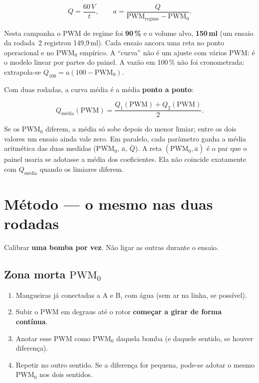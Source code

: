 \documentclass[11pt,a4paper]{article}
\newcommand{\pwmz}{\mathrm{PWM}_0}
\begin{document}
\begin{equation}
Q = \frac{60\,V}{t},
\qquad
a = \frac{Q}{\mathrm{PWM}_{\mathrm{regime}} - \pwmz}.
\end{equation}

Nesta campanha o PWM de regime foi \textbf{90\,\%} e o volume alvo,
\textbf{150\,ml} (um ensaio da rodada~2 registrou 149,9\,ml). Cada ensaio
ancora uma reta no ponto operacional e no $\pwmz$ empírico. A ``curva'' não é
um ajuste com vários PWM: é o modelo linear por partes do painel.
A vazão em 100\,\% não foi cronometrada: extrapola-se
$Q_{100}=a(100-\pwmz)$.

Com duas rodadas, a curva média é a média \textbf{ponto a ponto}:

\begin{equation}
Q_{\text{média}}(\mathrm{PWM})
  = \frac{Q_1(\mathrm{PWM}) + Q_2(\mathrm{PWM})}{2}.
\end{equation}

Se os $\pwmz$ diferem, a média só sobe depois do menor limiar; entre os dois
valores um ensaio ainda vale zero. Em paralelo, cada parâmetro ganha a média
aritmética das duas medidas ($\overline{\pwmz}$, $\bar a$, $\bar Q$).
A reta $(\overline{\pwmz},\bar a)$ é o par que o painel usaria se adotasse a
média dos coeficientes. Ela não coincide exatamente com $Q_{\text{média}}$
quando os limiares diferem.

\section{Método --- o mesmo nas duas rodadas}

Calibrar \textbf{uma bomba por vez}. Não ligar as outras durante o ensaio.

\subsection{Zona morta \texorpdfstring{$\pwmz$}{PWM0}}

\begin{enumerate}
  \item Mangueiras já conectadas a A e B, com água (sem ar na linha, se possível).
  \item Subir o PWM em degraus até o rotor \textbf{começar a girar de forma contínua}.
  \item Anotar esse PWM como $\pwmz$ daquela bomba (e daquele sentido, se houver diferença).
  \item Repetir no outro sentido. Se a diferença for pequena, pode-se adotar o
        mesmo $\pwmz$ nos dois sentidos.
\end{enumerate}
\end{document}
